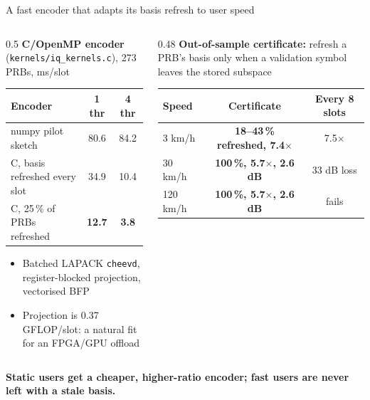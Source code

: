 \documentclass[aspectratio=169,11pt,xcolor=table]{beamer}
\newcommand{\best}[1]{\textbf{\textcolor{good}{#1}}}
\newcommand{\ours}{\rowcolor{good!15}}
\newcommand{\takeaway}[1]{%
  \vfill
  \begin{alertblock}{}\centering\textbf{#1}\end{alertblock}}
\begin{document}
\begin{frame}{A fast encoder that adapts its basis refresh to user speed}
  \begin{columns}[T]
    \begin{column}{0.5\textwidth}
      \footnotesize\textbf{C/OpenMP encoder} (\texttt{kernels/iq\_kernels.c}), 273 PRBs, ms/slot\\[1mm]
      \scriptsize\setlength{\tabcolsep}{4pt}
      \begin{tabular}{lcc}
        \toprule
        Encoder & 1 thr & 4 thr \\
        \midrule
        numpy pilot sketch & 80.6 & 84.2 \\
        C, basis refreshed every slot & 34.9 & 10.4 \\
        \ours C, 25\,\% of PRBs refreshed & \best{12.7} & \best{3.8} \\
        \bottomrule
      \end{tabular}
      \vspace{2mm}
      \begin{itemize}\scriptsize
        \item Batched LAPACK \texttt{cheevd}, register-blocked projection, vectorised BFP
        \item Projection is 0.37 GFLOP/slot: a natural fit for an FPGA/GPU offload
      \end{itemize}
    \end{column}
    \begin{column}{0.48\textwidth}
      \footnotesize\textbf{Out-of-sample certificate:} refresh a PRB's basis only when a validation symbol
      leaves the stored subspace\\[1mm]
      \scriptsize\setlength{\tabcolsep}{3pt}
      \begin{tabular}{lcc}
        \toprule
        Speed & \textbf{Certificate} & Every 8 slots \\
        \midrule
        3 km/h & \best{18--43\,\% refreshed, 7.4$\times$} & 7.5$\times$ \\
        30 km/h & \best{100\,\%, 5.7$\times$, 2.6 dB} & 33 dB loss \\
        120 km/h & \best{100\,\%, 5.7$\times$, 2.6 dB} & fails \\
        \bottomrule
      \end{tabular}
    \end{column}
  \end{columns}
  \takeaway{Static users get a cheaper, higher-ratio encoder; fast users are never left with a stale basis.}
\end{frame}
\end{document}
